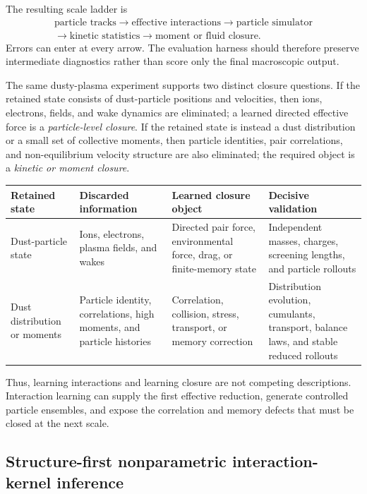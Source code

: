 The resulting scale ladder is
\[
\begin{gathered}
\text{particle tracks}
\longrightarrow
\text{effective interactions}
\longrightarrow
\text{particle simulator}
\\[-0.15em]
\longrightarrow
\text{kinetic statistics}
\longrightarrow
\text{moment or fluid closure}.
\end{gathered}
\]
Errors can enter at every arrow. The evaluation harness should therefore preserve intermediate diagnostics rather than score only the final macroscopic output.

The same dusty-plasma experiment supports two distinct closure questions. If the retained state consists of dust-particle positions and velocities, then ions, electrons, fields, and wake dynamics are eliminated; a learned directed effective force is a \emph{particle-level closure}. If the retained state is instead a dust distribution or a small set of collective moments, then particle identities, pair correlations, and non-equilibrium velocity structure are also eliminated; the required object is a \emph{kinetic or moment closure}.

\begin{center}
\begin{tabularx}{\textwidth}{@{}P{0.20\textwidth}P{0.25\textwidth}P{0.24\textwidth}Y@{}}
\toprule
\textbf{Retained state} & \textbf{Discarded information} & \textbf{Learned closure object} & \textbf{Decisive validation} \\
\midrule
Dust-particle state & Ions, electrons, plasma fields, and wakes & Directed pair force, environmental force, drag, or finite-memory state & Independent masses, charges, screening lengths, and particle rollouts \\
Dust distribution or moments & Particle identity, correlations, high moments, and particle histories & Correlation, collision, stress, transport, or memory correction & Distribution evolution, cumulants, transport, balance laws, and stable reduced rollouts \\
\bottomrule
\end{tabularx}
\end{center}

Thus, learning interactions and learning closure are not competing descriptions. Interaction learning can supply the first effective reduction, generate controlled particle ensembles, and expose the correlation and memory defects that must be closed at the next scale.

\subsection{Structure-first nonparametric interaction-kernel inference}


